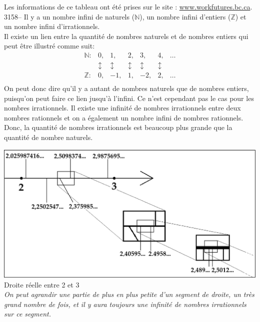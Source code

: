 \documentclass[letterpaper, 12pt]{article}
\begin{document}
Les informations de ce tableau ont \'et\'e prises sur le site : \href{http://www.workfutures.bc.ca/article.cfm?lang=fr&article=how_find&site=graphic}{www.workfutures.bc.ca}.\\



3158-- Il y a un nombre infini de naturels ($\mathbb N$), un nombre infini d'entiers ($\mathbb Z$) et un nombre infini d'irrationnels.\\

Il existe un lien entre la quantit\'e de nombres naturels et de nombres entiers qui peut \^etre illustr\'e comme suit:\\
\begin{displaymath}
\begin{array}{ccccccc}
\mathbb{N}: & 0, & 1, & 2, & 3, & 4, & \ldots\\
& \updownarrow & \updownarrow & \updownarrow & \updownarrow & \updownarrow & \\
\mathbb{Z}: & 0, & -1, & 1, & -2, & 2, & \ldots\\
\end{array}
\end{displaymath}
On peut donc dire qu'il y a autant de nombres naturels que de nombres entiers, puisqu'on peut faire ce lien jusqu'\`a l'infini. Ce n'est cependant pas le cas pour les nombres irrationnels. Il existe une infinit\'e de nombres irrationnels entre deux nombres rationnels et on a \'egalement un nombre infini de nombres rationnels. Donc, la quantit\'e de nombres irrationnels est beaucoup plus grande que la quantit\'e de nombre naturels.\\
\begin{center}
\includegraphics[scale=0.4]{droiteirrationnelle.eps}\\
Droite r\'eelle entre 2 et 3\\
\emph{{\small On peut agrandir une partie de plus en plus petite d'un segment de droite, un tr\`es grand nombre de fois, et il y aura toujours une infinit\'e de nombres irrationnels sur ce segment.}}\\
\end{center}
\end{document}
